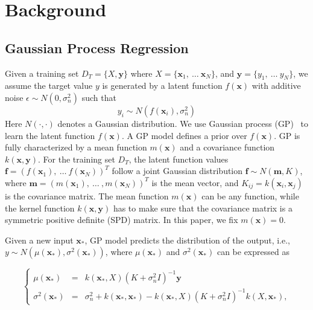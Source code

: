 \section{Background}\label{sec:Background}

\subsection{Gaussian Process Regression}\label{sec:SOGP}

Given a training set $D_T = \{X, \bm{y}\}$ where $X = \{\bm{x}_1,~\dots~\bm{x}_N\}$, and $\bm{y} = \{y_1,~\dots~y_N\}$, we assume the target value $y$ is generated
by a latent function $f(\bm{x})$ with additive noise $\epsilon \sim N(0, \sigma_n^2)$ such that
\begin{equation}
    \label{eq:yf}
    y_i \sim N(f(\bm{x}_i), \sigma_n^2)
\end{equation}
Here $N(\cdot, \cdot)$ denotes a Gaussian distribution. We use Gaussian process (GP)~\cite{GPML} to learn the latent function $f(\bm{x})$. A GP model defines a prior over $f(\bm{x})$. GP is fully characterized by a mean function $m(\bm{x})$ and a covariance function $k(\bm{x}, \bm{y})$. For the training set $D_T$, the latent function values $\bm{f} = (f(\bm{x}_1),~\dots~f(\bm{x}_N))^T$ follow a joint Gaussian distribution $\bm{f} \sim N(\bm{m}, K)$, where $\bm{m} = (m(\bm{x}_1),~\dots~,m(\bm{x}_N))^T$ is the mean vector, and $K_{ij} = k(\bm{x}_i, \bm{x}_j)$ is the covariance matrix. The mean function $m(\bm{x})$ can be any function, while the kernel function $k(\bm{x}, \bm{y})$ has to make sure that the covariance matrix is a symmetric positive definite (SPD) matrix. In this paper, we fix $m(\bm{x}) = 0$.

Given a new input $\bm{x}_*$, GP model predicts the distribution of the output, i.e., $y \sim N(\mu(\bm{x}_*), \sigma^2(\bm{x}_*))$, where $\mu(\bm{x}_*)$ and $\sigma^2(\bm{x}_*)$ can be expressed as

\begin{equation}
    \left\{
        \begin{array}{lll}
            \mu(\bm{x}_*)      &=& k(\bm{x}_*, X) (K + \sigma_n^2 I)^{-1} \bm{y} \\
            \sigma^2(\bm{x}_*) &=& \sigma_n^2 + k(\bm{x}_*, \bm{x}_*) - k(\bm{x}_*, X) (K + \sigma_n^2 I)^{-1} k(X, \bm{x}_*),
        \end{array}
    \right.
    \label{eq:GPRPred}
\end{equation}

